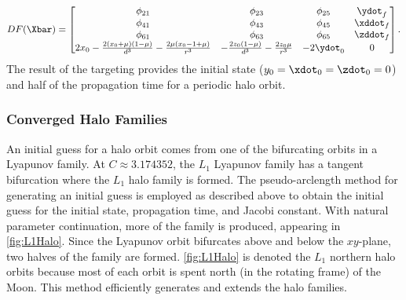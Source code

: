 \begin{equation}
    DF(\Xbar)=\begin{bmatrix}   \phi_{21}                                                                   &   \phi_{23}                                               &   \phi_{25}                                   &   \ydot_{f}                               \\
                                \phi_{41}                                                                   &   \phi_{43}                                               &   \phi_{45}                                   &   \xddot_{f}                              \\
                                \phi_{61}                                                                   &   \phi_{63}                                               &   \phi_{65}                                   &   \zddot_{f}                              \\
                                2x_{0}-\frac{2(x_{0}+\mu)(1-\mu)}{d^{3}}-\frac{2\mu(x_{0}-1+\mu)}{r^{3}}    &   -\frac{2z_{0}(1-\mu)}{d^{3}}-\frac{2z_{0}\mu}{r^{3}}    &   -2\ydot_{0}                                 &   0                                       \end{bmatrix}.
    \label{eq:halojacobian}
\end{equation}
The result of the targeting provides the initial state ($y_{0}=\xdot_{0}=\zdot_{0}=0$) and half of
the propagation time for a periodic halo orbit.

\subsubsection{Converged Halo Families}
An initial guess for a halo orbit comes from one of the bifurcating orbits in a Lyapunov family. At
$C\approx3.174352$, the $L_{1}$ Lyapunov family has a tangent bifurcation where the $L_{1}$ halo
family is formed. The pseudo-arclength method for generating an initial guess is employed as described
above to obtain the initial guess for the initial state, propagation time, and Jacobi constant.
With natural parameter continuation, more of the family is produced, appearing in \cref{fig:L1Halo}.
Since the Lyapunov orbit bifurcates above and below the $xy$-plane, two halves of the family are
formed. \cref{fig:L1Halo} is denoted the $L_{1}$ northern halo orbits because most of each orbit is
spent north (in the rotating frame) of the Moon. This method efficiently generates and extends the
halo families.

